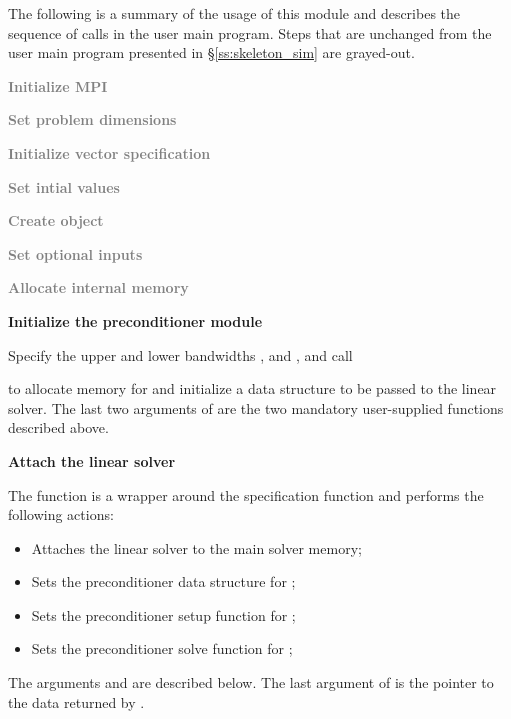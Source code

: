 The following is a summary of the usage of this module and describes the sequence 
of calls in the user main program. Steps that are unchanged from the user main
program presented in \S\ref{ss:skeleton_sim} are grayed-out.
\begin{Steps}
\item 
  \textcolor{gray}{\bf Initialize MPI}

\item
  \textcolor{gray}{\bf Set problem dimensions}

\item
  \textcolor{gray}{\bf Initialize vector specification}

\item
  \textcolor{gray}{\bf Set intial values}
 
\item
  \textcolor{gray}{\bf Create {\cvode} object}

\item
  \textcolor{gray}{\bf Set optional inputs}

\item
  \textcolor{gray}{\bf Allocate internal memory}

\item \label{i:bbdpre_init}
  {\bf Initialize the {\cvbbdpre} preconditioner module}

  Specify the upper and lower bandwidths ,  and
  ,  and call 


  to allocate memory for and initialize a data structure  to be 
  passed to the {\cvspgmr} linear solver. The last two arguments of 
  are the two mandatory user-supplied functions described above.

\item \label{i:bbdpre_attach}
  {\bf Attach the {\cvspgmr} linear solver}


  The function  is a wrapper around the {\cvspgmr} specification
  function  and performs the following actions:
  \begin{itemize}
    \item Attaches the {\cvspgmr} linear solver to the main {\cvode} solver memory;
    \item Sets the preconditioner data structure for {\cvbbdpre};
    \item Sets the preconditioner setup function for {\cvbbdpre};
    \item Sets the preconditioner solve function for {\cvbbdpre};
  \end{itemize}
  The arguments  and  are described below.
  The last argument of  is the pointer to the {\cvbbdpre} data
  returned by .


\end{Steps}
